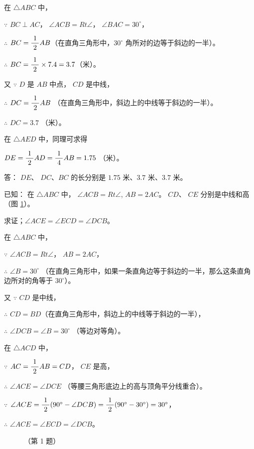 \begin{enhancedline}
\jie 在 $\triangle ABC$ 中，

$\because$ \quad $BC \perp AC$， $\angle ACB = Rt \angle$， $\angle BAC = 30^\circ$，

$\therefore$ \quad $BC = \dfrac{\; 1 \;}{2} AB$（在直角三角形中，$30^\circ$ 角所对的边等于斜边的一半）。

$\therefore$ \quad $BC = \dfrac{\; 1 \;}{2} \times 7.4 = 3.7$（米）。

又 $\because$ \quad $D$ 是 $AB$ 中点， $CD$ 是中线，

$\therefore$ \quad $DC = \dfrac{\; 1 \;}{2} AB$ （在直角三角形中，斜边上的中线等于斜边的一半）。

$\therefore$ \quad $DC = 3.7$ （米）。

在 $\triangle AED$ 中，同理可求得

\qquad $DE = \dfrac{\; 1 \;}{2} AD = \dfrac{\; 1 \;}{4} AB =  1.75$ （米）。

答： $DE$、 $DC$、$BC$ 的长分别是 $1.75$ 米、$3.7$ 米、$3.7$ 米。


\liti 已知： 在 $\triangle ABC$ 中， $\angle ACB = Rt \angle$, $AB = 2 AC$。
$CD$、 $CE$ 分别是中线和高（图 \ref{fig:czjh1-3-50}）。

求证；$\angle ACE = \angle ECD = \angle DCB$。

\zhengming 在 $\triangle ABC$ 中，

$\because$ \quad $\angle ACB = Rt \angle$， $AB = 2 AC$，

$\therefore$ \quad $\angle B = 30^\circ$
 （在直角三角形中，如果一条直角边等于斜边的一半，那么这条直角边所对的角等于 $30^\circ$）。

又 $\because$ \quad $CD$ 是中线，

$\therefore$ \quad $CD = BD$（在直角三角形中，斜边上的中线等于斜边的一半），

$\therefore$ \quad $\angle DCB = \angle B = 30^\circ$ （等边对等角）。

在 $\triangle ACD$ 中，

$\because$ \quad $AC = \dfrac{\; 1 \;}{2} AB = CD$， $CE$ 是高，

$\therefore$ \quad $\angle ACE = \angle DCE$ （等腰三角形底边上的高与顶角平分线重合）。

$\because$ \quad $\angle ACE = \dfrac{\; 1 \;}{2} (90^\circ - \angle DCB) = \dfrac{\; 1 \;}{2} (90^\circ - 30^\circ) = 30^\circ$，

$\therefore$ \quad $\angle ACE = \angle ECD = \angle DCB$。

\begin{figure}[htbp]
    \centering
    \begin{minipage}[b]{7cm}
        \centering
        
        \caption{}\label{fig:czjh1-3-50}
    \end{minipage}
    \qquad
    \begin{minipage}[b]{7cm}
        \centering
        
        \caption*{（第 1 题）}
    \end{minipage}
\end{figure}



\end{enhancedline}

